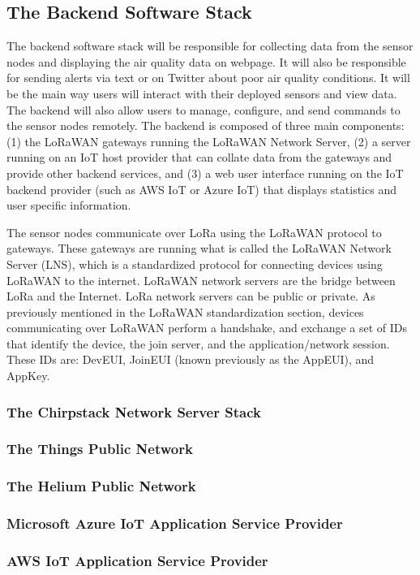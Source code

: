 \subsection{The Backend Software Stack}
The backend software stack will be responsible for collecting data from the
sensor nodes and displaying the air quality data on webpage. It will also be
responsible for sending alerts via text or on Twitter about poor air quality
conditions. It will be the main way users will interact with their deployed
sensors and view data. The backend will also allow users to manage, configure,
and send commands to the sensor nodes remotely. The backend is composed of three
main components: (1) the LoRaWAN gateways running the LoRaWAN Network Server,
(2) a server running on an IoT host provider that can collate data from the
gateways and provide other backend services, and (3) a web user interface
running on the IoT backend provider (such as AWS IoT or Azure IoT) that displays
statistics and user specific information.

The sensor nodes communicate over LoRa using the LoRaWAN protocol to gateways.
These gateways are running what is called the LoRaWAN Network Server (LNS),
which is a standardized protocol for connecting devices using LoRaWAN to the
internet.  LoRaWAN network servers are the bridge between LoRa and the Internet.
LoRa network servers can be public or private. As previously mentioned in the
LoRaWAN standardization section, devices communicating over LoRaWAN perform a
handshake, and exchange a set of IDs that identify the device, the join server,
and the application/network session. These IDs are: DevEUI, JoinEUI (known
previously as the AppEUI), and AppKey.

\subsubsection{The Chirpstack Network Server Stack}
\subsubsection{The Things Public Network}
\subsubsection{The Helium Public Network}
\subsubsection{Microsoft Azure IoT Application Service Provider}
\subsubsection{AWS IoT Application Service Provider}
